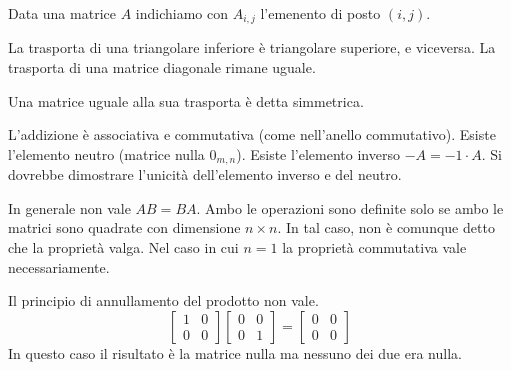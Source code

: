 \documentclass[a4paper]{article}
\begin{document}
Data una matrice \(A\) indichiamo con \(A_{i,j}\) l'emenento di posto \((i,j)\).

La trasporta di una triangolare inferiore è triangolare superiore, e viceversa.
La trasporta di una matrice diagonale rimane uguale.

Una matrice uguale alla sua trasporta è detta simmetrica.


L'addizione è associativa e commutativa (come nell'anello commutativo).
Esiste l'elemento neutro (matrice nulla \(0_{m,n}\)).
Esiste l'elemento inverso \(-A = -1 \cdot A\).
Si dovrebbe dimostrare l'unicità dell'elemento inverso e del neutro.




In generale non vale \(AB=BA\). Ambo le operazioni sono definite solo se ambo le matrici sono quadrate
con dimensione \(n\times n\). In tal caso, non è comunque detto che la proprietà valga.
Nel caso in cui \(n=1\) la proprietà commutativa vale necessariamente.

Il principio di annullamento del prodotto non vale.
\[
    \begin{bmatrix}
        1 & 0 \\
        0 & 0
    \end{bmatrix}
    \begin{bmatrix}
        0 & 0 \\
        0 & 1
    \end{bmatrix}
    =
    \begin{bmatrix}
        0 & 0 \\
        0 & 0
    \end{bmatrix}
\]
In questo caso il risultato è la matrice nulla ma nessuno dei due era nulla.

\end{document}

